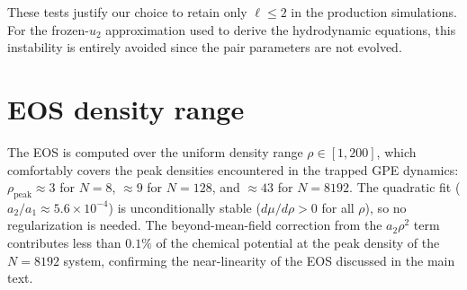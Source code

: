 \documentclass[aps,prl,onecolumn,superscriptaddress,longbibliography,nofootinbib]{revtex4-2}
\begin{document}
These tests justify our choice to retain only $\ell\leq 2$ in the
production simulations.  For the frozen-$u_2$ approximation used to
derive the hydrodynamic equations, this instability is entirely avoided
since the pair parameters are not evolved.

\section{EOS density range}
\label{sec:eos_range}

The EOS is computed over the uniform density range
$\rho\in[1,200]$, which comfortably covers the peak densities
encountered in the trapped GPE dynamics: $\rho_{\mathrm{peak}}\approx 3$
for $N=8$, $\approx 9$ for $N=128$, and $\approx 43$ for $N=8192$.
The quadratic fit ($a_2/a_1\approx 5.6\times10^{-4}$) is
unconditionally stable ($d\mu/d\rho>0$ for all $\rho$), so no
regularization is needed.  The beyond-mean-field correction from the
$a_2\rho^2$ term contributes less than $0.1\%$ of the chemical
potential at the peak density of the $N=8192$ system, confirming the
near-linearity of the EOS discussed in the main text.


\end{document}
